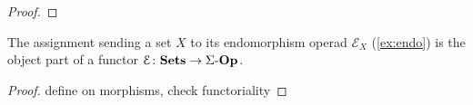 \begin{proof}
%
%
%
%
\end{proof}


\begin{prop}\label{prop:e-fun}
The assignment sending a set $X$ to its endomorphism operad $\mathcal{E}_X$ (\cref{ex:endo}) is the object part of a functor $\mathcal{E} \colon \mathbf{Sets} \to \Sigma\mbox{-}\mathbf{Op}$.
\end{prop}
\begin{proof}
define on morphisms, check functoriality
\end{proof}

